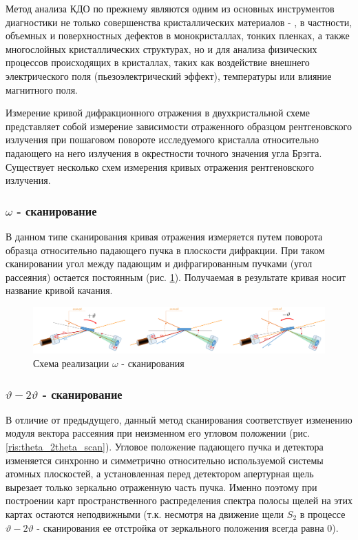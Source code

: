 Метод анализа КДО по прежнему являются одним из основных инструментов диагностики не только совершенства
кристаллических материалов \cite{sov_1} - \cite{sov_5}, в частности, объемных и поверхностных дефектов в
монокристаллах, тонких пленках, а также многослойных кристаллических структурах, но и для анализа физических
процессов происходящих в кристаллах, таких как воздействие внешнего электрического поля \cite{piezo102} (пьезоэлектрический эффект),
 температуры \cite{temp} или влияние магнитного поля.

Измерение кривой дифракционного отражения в двухкристальной схеме представляет
собой измерение зависимости отраженного образцом рентгеновского излучения при
пошаговом повороте исследуемого кристалла относительно падающего на него
излучения в окрестности точного значения угла Брэгга.
Существует несколько схем измерения кривых отражения рентгеновского излучения.

\subsubsection*{$\omega$ - сканирование}
В данном типе сканирования кривая отражения измеряется путем поворота образца
относительно падающего пучка в плоскости дифракции. При таком сканировании
угол между падающим и дифрагированным пучками (угол рассеяния) остается постоянным
(рис. \ref{ris:omega_scan}). Получаемая в результате кривая носит название кривой качания.


\begin{figure}[H]
  \centering
  \includegraphics[width=1\textwidth]{images/omega_scan.png}
  \caption{Схема реализации $\omega $ - сканирования}
  \label{ris:omega_scan}
\end{figure}

\subsubsection*{$\vartheta - 2\vartheta$ - сканирование}
В отличие от предыдущего, данный метод сканирования соответствует изменению
 модуля вектора рассеяния при неизменном его угловом положении
 (рис. \ref{ris:theta_2theta_scan}). Угловое положение падающего пучка и
 детектора изменяется синхронно и симметрично относительно используемой системы
 атомных плоскостей, а установленная перед детектором апертурная щель вырезает
  только зеркально отраженную часть пучка. Именно поэтому при построении карт
   пространственного распределения спектра полосы щелей на этих картах остаются
   неподвижными (т.к. несмотря на движение щели  $S_2$ в процессе
    $\vartheta - 2\vartheta$ -  сканирования ее отстройка от зеркального
    положения всегда равна 0).

